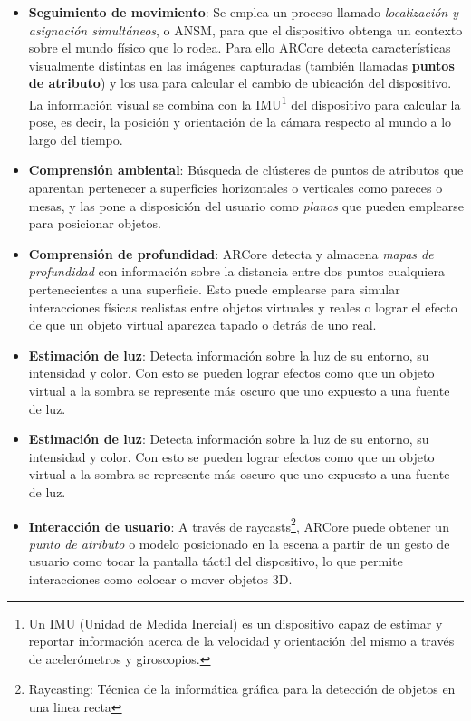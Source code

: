 \begin{itemize}
    \item \textbf{Seguimiento de movimiento}: Se emplea un proceso llamado \textit{localización y asignación simultáneos}, o ANSM, para que el dispositivo obtenga un contexto sobre el mundo físico que lo rodea. Para ello ARCore detecta características visualmente distintas en las imágenes capturadas (también llamadas \textbf{puntos de atributo}) y los usa para calcular el cambio de ubicación del dispositivo. La información visual se combina con la IMU\footnote{Un IMU (Unidad de Medida Inercial) es un dispositivo capaz de estimar y reportar información acerca de la velocidad y orientación del mismo a través de acelerómetros y giroscopios.} del dispositivo para calcular la pose, es decir, la posición y orientación de la cámara respecto al mundo a lo largo del tiempo.

    \item \textbf{Comprensión ambiental}: Búsqueda de clústeres de puntos de atributos que aparentan pertenecer a superficies horizontales o verticales como pareces o mesas, y las pone a disposición del usuario como \textit{planos} que pueden emplearse para posicionar objetos.

    \item \textbf{Comprensión de profundidad}: ARCore detecta y almacena \textit{mapas de profundidad} con información sobre la distancia entre dos puntos cualquiera pertenecientes a una superficie. Esto puede emplearse para simular interacciones físicas realistas entre objetos virtuales y reales o lograr el efecto de que un objeto virtual aparezca tapado o detrás de uno real.

    \item \textbf{Estimación de luz}: Detecta información sobre la luz de su entorno, su intensidad y color. Con esto se pueden lograr efectos como que un objeto virtual a la sombra se represente más oscuro que uno expuesto a una fuente de luz.

    \item \textbf{Estimación de luz}: Detecta información sobre la luz de su entorno, su intensidad y color. Con esto se pueden lograr efectos como que un objeto virtual a la sombra se represente más oscuro que uno expuesto a una fuente de luz.

    \item \textbf{Interacción de usuario}: A través de raycasts\footnote{Raycasting: Técnica de la informática gráfica para la detección de objetos en una linea recta}, ARCore puede obtener un \textit{punto de atributo} o modelo posicionado en la escena a partir de un gesto de usuario como tocar la pantalla táctil del dispositivo, lo que permite interacciones como colocar o mover objetos 3D.


\end{itemize}
